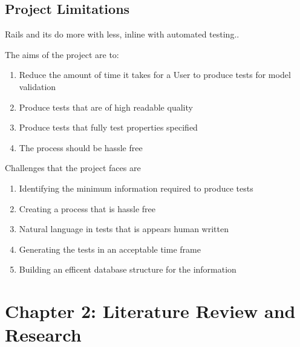 \documentclass{article}
\begin{document}
\subsection{Project Limitations}

\par Rails and its do more with less, inline with automated testing..

\par The aims of the project are to:
\begin{enumerate}
\item Reduce the amount of time it takes for a User to produce tests for model validation
\item Produce tests that are of high readable quality
\item Produce tests that fully test properties specified
\item The process should be hassle free
\end{enumerate}

\par Challenges that the project faces are
\begin{enumerate}
\item Identifying the minimum information required to produce tests
\item Creating a process that is hassle free
\item Natural language in tests that is appears human written
\item Generating the tests in an acceptable time frame
\item Building an efficent database structure for the information
\end{enumerate}


\section{Chapter 2: Literature Review and Research}
\end{document}
